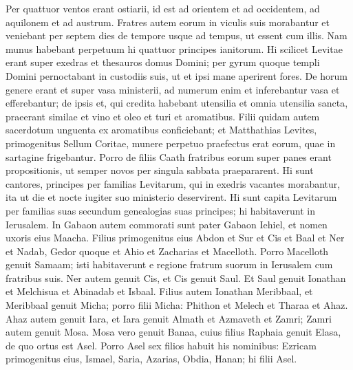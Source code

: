 \begin{biblechapter}
\begin{biblechapter}
\begin{biblechapter}
\begin{biblechapter}
\begin{biblechapter}
\begin{biblechapter}
\begin{biblechapter}
\begin{biblechapter}
\begin{biblechapter}
\verse Per quattuor ventos erant ostiarii, id est ad orientem et ad occidentem, ad aquilonem et ad austrum. 
 \verse Fratres autem eorum in viculis suis morabantur et veniebant per septem dies de tempore usque ad tempus, ut essent cum illis. 
\verse Nam munus habebant perpetuum hi quattuor principes ianitorum. Hi scilicet Levitae erant super exedras et thesauros domus Domini; 
\verse per gyrum quoque templi Domini pernoctabant in custodiis suis, ut et ipsi mane aperirent fores.
 \verse De horum genere erant et super vasa ministerii, ad numerum enim et inferebantur vasa et efferebantur; 
\verse de ipsis et, qui credita habebant utensilia et omnia utensilia sancta, praeerant similae et vino et oleo et turi et aromatibus. 
\verse Filii quidam autem sacerdotum unguenta ex aromatibus conficiebant; 
\verse et Matthathias Levites, primogenitus Sellum Coritae, munere perpetuo praefectus erat eorum, quae in sartagine frigebantur. 
\verse Porro de filiis Caath fratribus eorum super panes erant propositionis, ut semper novos per singula sabbata praepararent. 
\verse Hi sunt cantores, principes per familias Levitarum, qui in exedris vacantes morabantur, ita ut die et nocte iugiter suo ministerio deservirent. 
\verse Hi sunt capita Levitarum per familias suas secundum genealogias suas principes; hi habitaverunt in Ierusalem.
 \verse In Gabaon autem commorati sunt pater Gabaon Iehiel, et nomen uxoris eius Maacha. 
\verse Filius primogenitus eius Abdon et Sur et Cis et Baal et Ner et Nadab, 
\verse Gedor quoque et Ahio et Zacharias et Macelloth. 
\verse Porro Macelloth genuit Samaam; isti habitaverunt e regione fratrum suorum in Ierusalem cum fratribus suis. 
\verse Ner autem genuit Cis, et Cis genuit Saul. Et Saul genuit Ionathan et Melchisua et Abinadab et Isbaal. 
\verse Filius autem Ionathan Meribbaal, et Meribbaal genuit Micha; 
\verse porro filii Micha: Phithon et Melech et Tharaa et Ahaz. 
\verse Ahaz autem genuit Iara, et Iara genuit Almath et Azmaveth et Zamri; Zamri autem genuit Mosa. 
\verse Mosa vero genuit Banaa, cuius filius Raphaia genuit Elasa, de quo ortus est Asel. 
\verse Porro Asel sex filios habuit his nominibus: Ezricam primogenitus eius, Ismael, Saria, Azarias, Obdia, Hanan; hi filii Asel.
 

\end{biblechapter}
\end{biblechapter}
\end{biblechapter}
\end{biblechapter}
\end{biblechapter}
\end{biblechapter}
\end{biblechapter}
\end{biblechapter}
\end{biblechapter}
